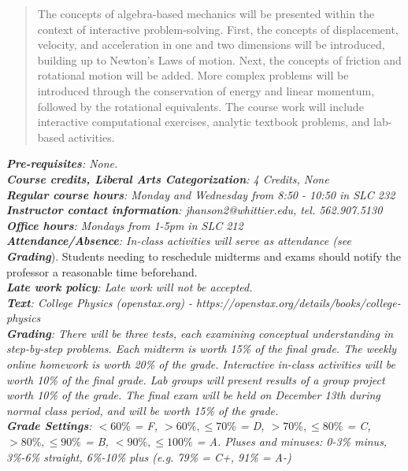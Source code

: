 \documentclass[10pt]{article}
\begin{document}
\maketitle

\begin{abstract}
The concepts of algebra-based mechanics will be presented within the context of interactive problem-solving.  First, the concepts of displacement, velocity, and acceleration in one and two dimensions will be introduced, building up to Newton's Laws of motion.  Next, the concepts of friction and rotational motion will be added.  More complex problems will be introduced through the conservation of energy and linear momentum, followed by the rotational equivalents.  The course work will include interactive computational exercises, analytic textbook problems, and lab-based activities.
\end{abstract}
\noindent
\textit{\textbf{Pre-requisites}: None.} \\
\textit{\textbf{Course credits, Liberal Arts Categorization}: 4 Credits, None} \\
\textit{\textbf{Regular course hours}: Monday and Wednesday from 8:50 - 10:50 in SLC 232} \\
\textit{\textbf{Instructor contact information}: jhanson2@whittier.edu, tel. 562.907.5130} \\
\textit{\textbf{Office hours}: Mondays from 1-5pm in SLC 212} \\
\textit{\textbf{Attendance/Absence}: In-class activities will serve as attendance (see \textit{\textbf{Grading}}}).  Students needing to reschedule midterms and exams should notify the professor a reasonable time beforehand. \\
\textit{\textbf{Late work policy}: Late work will not be accepted.} \\
\textit{\textbf{Text}: College Physics (openstax.org) -  https://openstax.org/details/books/college-physics} \\
\textit{\textbf{Grading}: There will be three tests, each examining conceptual understanding in step-by-step problems.  Each midterm is worth 15\% of the final grade.  The weekly online homework is worth 20\% of the grade.  Interactive in-class activities will be worth 10\% of the final grade.  Lab groups will present results of a group project worth 10\% of the grade.  The final exam will be held on December 13th during normal class period, and will be worth 15\% of the grade.} \\
\textit{\textbf{Grade Settings}: $<60\%$ = F, $>60\%,\leq 70\%$ = D, $>70\%,\leq80\%$ = C, $>80\%,\leq 90\%$ = B, $<90\%,\leq 100\%$ = A.  Pluses and minuses: 0-3\% minus, 3\%-6\% straight, 6\%-10\% plus (e.g. 79\% = C+, 91\% = A-)} \\
\end{document}
